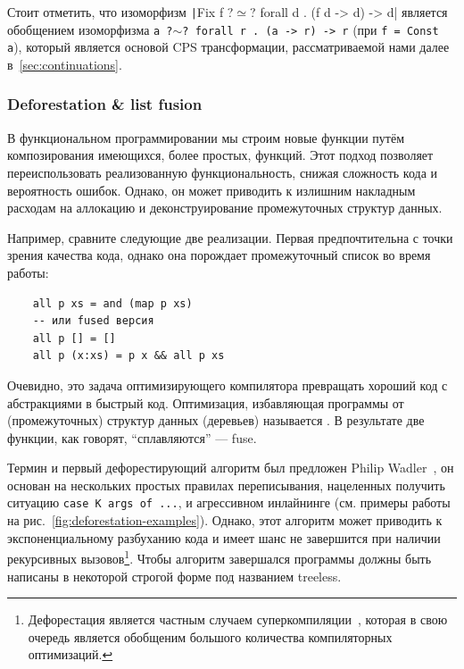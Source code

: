 Стоит отметить, что изоморфизм \texttt|Fix f ?$\simeq$? forall d . (f d -> d) -> d| является обобщением изоморфизма \texttt{a ?$\sim$? forall r . (a -> r) -> r} (при \texttt{f = Const a}), который является основой CPS трансформации, рассматриваемой нами далее в~\ref{sec:continuations}.

\subsubsection{Deforestation \& list fusion} \label{subsubsec:deforestation-fusion}

В функциональном программировании мы строим новые функции путём композирования имеющихся, более простых, функций.
Этот подход позволяет переиспользовать реализованную функциональность, снижая сложность кода и вероятность ошибок.
Однако, он может приводить к излишним накладным расходам на аллокацию и деконструирование промежуточных структур данных.

Например, сравните следующие две реализации.
Первая предпочтительна с точки зрения качества кода, однако она порождает промежуточный список во время работы:
\begin{verbatim}
    all p xs = and (map p xs)
    -- или fused версия
    all p [] = []
    all p (x:xs) = p x && all p xs
\end{verbatim}

Очевидно, это задача оптимизирующего компилятора превращать хороший код с абстракциями в быстрый код.
Оптимизация, избавляющая программы от (промежуточных) структур данных (деревьев) называется .
В результате две функции, как говорят, ``сплавляются'' --- fuse.

Термин и первый дефорестирующий алгоритм был предложен Philip Wadler~\cite{wadler1988deforestation}, он основан на нескольких простых правилах переписывания, нацеленных получить ситуацию \texttt{case K args of ...}, и агрессивном инлайнинге (см. примеры работы на рис.~\ref{fig:deforestation-examples}).
Однако, этот алгоритм может приводить к экспоненциальному разбуханию кода и имеет шанс не завершится при наличии рекурсивных вызовов\footnote{Дефорестация является частным случаем суперкомпиляции~\cite{supercomp}, которая в свою очередь является обобщеним большого количества компиляторных оптимизаций.}.
Чтобы алгоритм завершался программы должны быть написаны в некоторой строгой форме под названием treeless.

